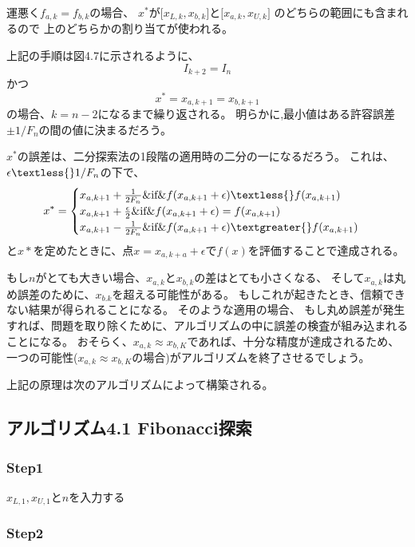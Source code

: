 運悪く$f_{a,k} = f_{b,k}$の場合、
$x^{\ast}$が$\lbrack x_{L,k} ,
x_{b,k} \rbrack$と$\lbrack x_{a,k}
, x_{U,k} \rbrack$ のどちらの範囲にも含まれるので
上のどちらかの割り当てが使われる。

上記の手順は図4.7に示されるように、 $$ I_{k+2} = I_n$$ かつ $$
x^\ast = x_{a,k+1} = x_{b, k+1} $$
の場合、$k=n-2$になるまで繰り返される。
明らかに,最小値はある許容誤差$\pm 1 / F_n$の間の値に決まるだろう。

$x^\ast$の誤差は、二分探索法の1段階の適用時の二分の一になるだろう。
これは、$\epsilon \textless{} 1 / F_n$の下で、
$$ x^\ast = \begin{cases}
x_{a,k+1} + \frac{1}{2F_n} \&
\text{if} \& f(x_{a,k+1} + \epsilon )
\textless{} f(x_{a,k+1}) \\
x_{a,k+1} + \frac{\epsilon}{2} \&
\text{if} \& f(x_{a,k+1} + \epsilon )
= f(x_{a,k+1}) \\ x_{a,k+1} -
\frac{1}{2F_n} \& \text{if} \&
f(x_{a,k+1} + \epsilon ) \textgreater{}
f(x_{a,k+1}) \\
\end{cases} $$
と$x\ast$を定めたときに、点$x=x_{a,k+a} +
\epsilon$で$f(x)$を評価することで達成される。

もし$n$がとても大きい場合、$x_{a,k}$と$x_{b,k}$の差はとても小さくなる、
そして$x_{a,k}$は丸め誤差のために、$x_{b.k}$を超える可能性がある。
もしこれが起きたとき、信頼できない結果が得られることになる。
そのような適用の場合、
もし丸め誤差が発生すれば、問題を取り除くために、アルゴリズムの中に誤差の検査が組み込まれることになる。
おそらく、$x_{a,k} \approx
x_{b,K}$であれば、十分な精度が達成されるため、
一つの可能性($x_{a,k} \approx
x_{b,K}$の場合)がアルゴリズムを終了させるでしょう。

上記の原理は次のアルゴリズムによって構築される。

\newpage

\subsection*{アルゴリズム4.1 Fibonacci探索}\label{-4-1-fibonacci-}

\subsubsection*{Step1}\label{step1}

$x_{L,1},x_{U,1}$と$n$を入力する

\subsubsection*{Step2}\label{step2}

